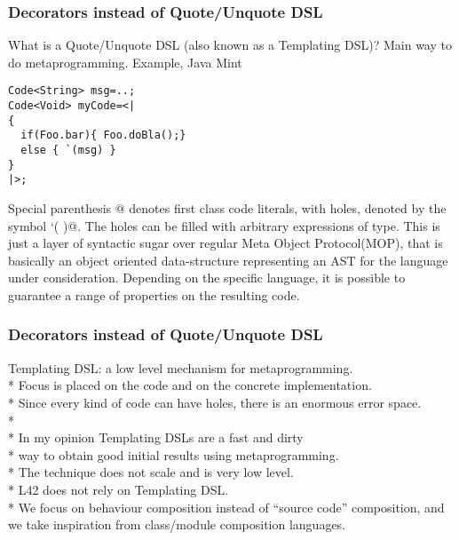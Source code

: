 \begin{frame}[fragile]
\frametitle{Decorators instead of Quote/Unquote DSL}
What is a Quote/Unquote DSL (also known as a Templating DSL)?
Main way to do metaprogramming.
Example, Java Mint
\begin{NiceCode}{59ex}{0.8}
\begin{lstlisting}
Code<String> msg=..;
Code<Void> myCode=<|
{
  if(Foo.bar){ Foo.doBla();}
  else { `(msg) }
}
|>;
\end{lstlisting}
\end{NiceCode}
Special parenthesis \Q@<|  |>@ denotes first class code literals,
with holes, denoted by the symbol \Q@`( )@.
The holes can be filled with arbitrary expressions of \Q@Code@ type.
This is just a layer of syntactic sugar over regular 
Meta Object Protocol(MOP), that is basically an object oriented data-structure representing
an AST for the language under consideration.
Depending on the specific language,
it is possible to guarantee a range of properties on the resulting code.
\end{frame}

\begin{frame}[fragile]
\frametitle{Decorators instead of Quote/Unquote DSL}

Templating DSL: a low level mechanism for metaprogramming.\\*
Focus is placed on the code and on the concrete implementation.\\*
Since every kind of code can have holes, there is an enormous error space.\\*
${}_{}$\\*\PresentationOnly\pause
In my opinion Templating DSLs are a fast and dirty \\*
way to obtain good initial results using metaprogramming.\\*
The technique does not scale and is very low level.
${}_{}$\\*\PresentationOnly\pause
L42 does \alert{not} rely on Templating DSL.\\*
We focus on behaviour composition instead of ``source code'' composition,
and we take inspiration from class/module composition languages.
\end{frame}



